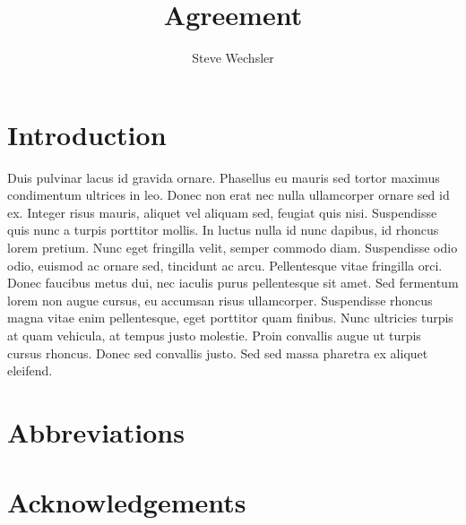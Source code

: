 \documentclass[output=paper]{langsci/langscibook}
\author{%
	Steve Wechsler\affiliation{University of Texas at Austin}%
}
\title{Agreement}
\begin{document}
\section{Introduction} 
Duis pulvinar lacus id gravida ornare. Phasellus eu mauris sed tortor maximus condimentum ultrices in leo. Donec non erat nec nulla ullamcorper ornare sed id ex. Integer risus mauris, aliquet vel aliquam sed, feugiat quis nisi. Suspendisse quis nunc a turpis porttitor mollis. In luctus nulla id nunc dapibus, id rhoncus lorem pretium. Nunc eget fringilla velit, semper commodo diam. Suspendisse odio odio, euismod ac ornare sed, tincidunt ac arcu. Pellentesque vitae fringilla orci. Donec faucibus metus dui, nec iaculis purus pellentesque sit amet. Sed fermentum lorem non augue cursus, eu accumsan risus ullamcorper. Suspendisse rhoncus magna vitae enim pellentesque, eget porttitor quam finibus. Nunc ultricies turpis at quam vehicula, at tempus justo molestie. Proin convallis augue ut turpis cursus rhoncus. Donec sed convallis justo. Sed sed massa pharetra ex aliquet eleifend. 

 
\section*{Abbreviations}
\section*{Acknowledgements}

\printbibliography[heading=subbibliography,notkeyword=this] 
\end{document}

